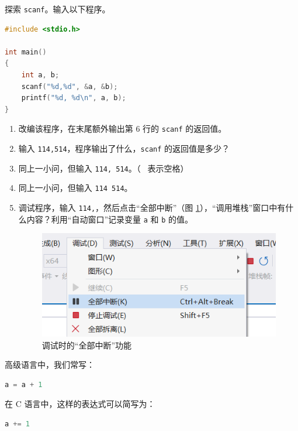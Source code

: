 
\begin{problemset}
	\item 探索 \lstinline{scanf}。输入以下程序。

	\begin{lstlisting}[language=c]
#include <stdio.h>

int main()
{
	int a, b;
	scanf("%d,%d", &a, &b);
	printf("%d, %d\n", a, b);
}
	\end{lstlisting}

	\begin{enumerate}
		\item 改编该程序，在末尾额外输出第 6 行的 \lstinline{scanf} 的返回值。
		\item 输入 \lstinline[showspaces=true]{114,514}，程序输出了什么，\lstinline{scanf} 的返回值是多少？
		\item 同上一小问，但输入 \lstinline[showspaces=true]{114, 514}。（\lstinline[showspaces=true]{ } 表示空格）
		\item 同上一小问，但输入 \lstinline[showspaces=true]{114 514}。
		\item 调试程序，输入 \lstinline[showspaces=true]{114,}，然后点击“全部中断”（图 \ref{pic:pause}），“调用堆栈”窗口中有什么内容？利用“自动窗口”记录变量 \lstinline{a} 和 \lstinline{b} 的值。

		\begin{figure}[H]
			\centering
			\includegraphics[width=0.5\linewidth]{pic/pause.png}
			\caption{调试时的“全部中断”功能}
			\label{pic:pause}
		\end{figure}
	\end{enumerate}

	\item 高级语言中，我们常写：
	\begin{lstlisting}[language=c, numbers=none]
a = a + 1
	\end{lstlisting}

	在 C 语言中，这样的表达式可以简写为：
	\begin{lstlisting}[language=c, numbers=none]
a += 1
	\end{lstlisting}


\end{problemset}
